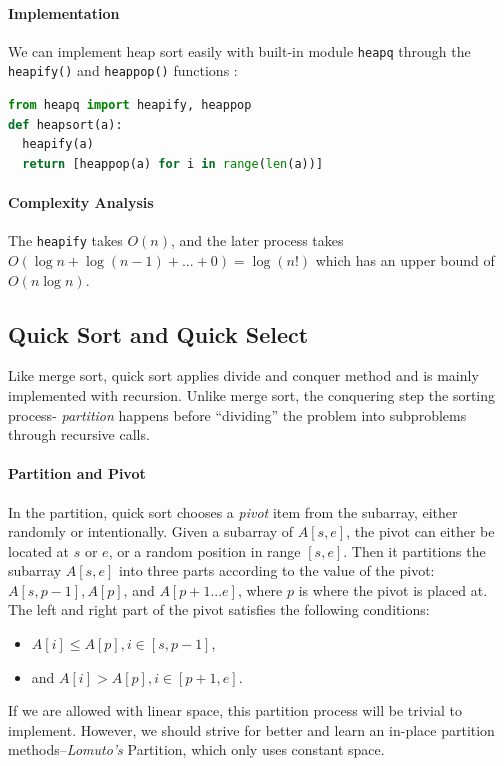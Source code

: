 \documentclass[../main.tex]{subfiles}
\begin{document}
\paragraph{Implementation}
We can implement heap sort easily with  built-in module \texttt{heapq}  through the \texttt{heapify()} and \texttt{heappop()} functions :
\begin{lstlisting}[language=Python]
from heapq import heapify, heappop
def heapsort(a):
  heapify(a)
  return [heappop(a) for i in range(len(a))]
\end{lstlisting}

\paragraph{Complexity Analysis} The \texttt{heapify}  takes $O(n)$, and the later process takes $O(\log n + \log {(n-1)} +... + 0) = \log (n!)$ which has an upper bound of $O(n\log n)$. %
\subsection{Quick Sort and Quick Select}
Like merge sort, quick sort applies divide and conquer method and is mainly implemented with recursion. Unlike merge sort, the conquering step the sorting process- \textit{partition} happens before ``dividing'' the problem into subproblems through recursive calls.  

\paragraph{Partition and Pivot} In the partition, quick sort chooses a \textit{pivot} item from the subarray, either randomly or intentionally. Given a subarray of $A[s, e]$, the pivot can either be located  at $s$ or $e$,  or a random position in range $[s, e]$. Then it partitions the subarray $A[s, e]$ into three parts according to the value of the pivot: $A[s, p-1], A[p]$, and $A[p+1...e]$, where $p$ is where the pivot is placed at. The left and right part of the pivot satisfies the following conditions:
\begin{itemize}
    \item 
$A[i] \le A[p], i \in [s, p-1]$, 
\item and $A[i] > A[p], i \in [p+1, e]$. 
\end{itemize}
If we are allowed with linear space, this partition process will be trivial to implement. However, we should strive for better and learn an in-place  partition methods--\textit{Lomuto's} Partition, which only uses constant space.
\end{document}
